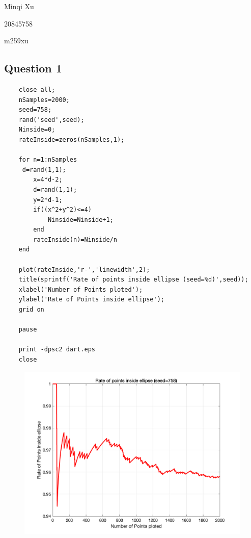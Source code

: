 \documentclass{article}
\begin{document}
Minqi Xu

20845758

m259xu

\subsection*{Question 1}

\begin{verbatim}
    close all;
    nSamples=2000;
    seed=758;
    rand('seed',seed);
    Ninside=0;
    rateInside=zeros(nSamples,1);

    for n=1:nSamples
     d=rand(1,1);
        x=4*d-2;
        d=rand(1,1);
        y=2*d-1;
        if((x^2+y^2)<=4)
            Ninside=Ninside+1;
        end
        rateInside(n)=Ninside/n
    end

    plot(rateInside,'r-','linewidth',2);
    title(sprintf('Rate of points inside ellipse (seed=%d)',seed));
    xlabel('Number of Points ploted');
    ylabel('Rate of Points inside ellipse');
    grid on

    pause

    print -dpsc2 dart.eps
    close
\end{verbatim}
\begin{figure}
    \includegraphics[width=\linewidth]{q1.png}
\end{figure}


\newpage
\end{document}
